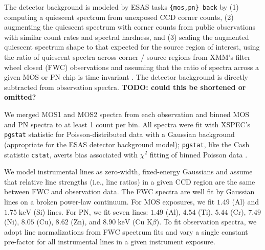 \documentclass[preprint2,tighten,trackchanges]{aastex6}
\newcommand*{\mt}{\mathrm}
\newcommand*{\unit}[1]{\;\mt{#1}}  %
\begin{document}
The detector background is modeled by ESAS tasks \texttt{\{mos,pn\}\_back}
by (1) computing a quiescent spectrum from unexposed CCD corner counts,
(2) augmenting the quiescent spectrum with corner counts from public
observations with similar count rates and spectral hardness, and (3) scaling
the augmented quiescent spectrum shape to that expected for the source region
of interest, using the ratio of quiescent spectra across corner / source
regions from XMM's filter wheel closed (FWC) observations and assuming that the
ratio of spectra across a given MOS or PN chip is time invariant
\citep[Sec. 3.4]{kuntz2008}.
The detector background is directly subtracted from observation spectra.
\textbf{TODO: could this be shortened or omitted?}  %

We merged MOS1 and MOS2 spectra from each observation and binned MOS and PN
spectra to at least 1 count per bin.
All spectra were fit with XSPEC's \texttt{pgstat} statistic for
Poisson-distributed data with a Gaussian background (appropriate for the ESAS
detector background model); \texttt{pgstat}, like the Cash statistic
\texttt{cstat}, averts bias associated with $\chi^2$ fitting of binned Poisson
data \citep{humphrey2009}.

We model instrumental lines as zero-width, fixed-energy Gaussians and assume
that relative line strengths (i.e., line ratios) in a given CCD region are the
same between FWC and observation data.
The FWC spectra are well fit by Gaussian lines on a broken power-law continuum.
For MOS exposures, we fit $1.49$ (Al) and $1.75 \unit{keV}$ (Si) lines.
For PN, we fit seven lines: $1.49$ (Al), $4.54$ (Ti), $5.44$ (Cr), $7.49$ (Ni),
$8.05$ (Cu), $8.62$ (Zn), and $8.90 \unit{keV}$ (Cu K$\beta$).
To fit observation spectra, we adopt line normalizations from FWC spectrum fits
and vary a single constant pre-factor for all instrumental lines in a given
instrument exposure.
%
\end{document}
